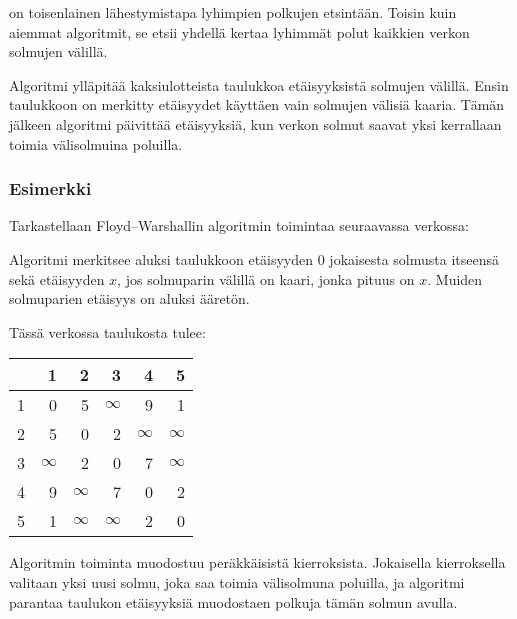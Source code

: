 
on toisenlainen lähestymistapa
lyhimpien polkujen etsintään.
Toisin kuin aiemmat algoritmit,
se  etsii yhdellä kertaa lyhimmät polut kaikkien
verkon solmujen välillä.


Algoritmi ylläpitää kaksiulotteista
taulukkoa etäisyyksistä solmujen
välillä.
Ensin taulukkoon on merkitty
etäisyydet käyttäen vain solmujen
välisiä kaaria.
Tämän jälkeen algoritmi
päivittää etäisyyksiä,
kun verkon solmut saavat yksi kerrallaan
toimia välisolmuina poluilla.

\subsubsection{Esimerkki}

Tarkastellaan Floyd–Warshallin
algoritmin toimintaa seuraavassa verkossa:

\begin{center}
\end{center}

Algoritmi merkitsee aluksi taulukkoon
etäisyyden 0 jokaisesta solmusta itseensä
sekä etäisyyden $x$, jos solmuparin välillä
on kaari, jonka pituus on $x$.
Muiden solmuparien etäisyys on aluksi ääretön.

Tässä verkossa taulukosta tulee:
\begin{center}
\begin{tabular}{r|rrrrr}
 & 1 & 2 & 3 & 4 & 5 \\
\hline
1 & 0 & 5 & $\infty$ & 9 & 1 \\
2 & 5 & 0 & 2 & $\infty$ & $\infty$ \\
3 & $\infty$ & 2 & 0 & 7 & $\infty$ \\
4 & 9 & $\infty$ & 7 & 0 & 2 \\
5 & 1 & $\infty$ & $\infty$ & 2 & 0 \\
\end{tabular}
\end{center}
\vspace{10pt}
Algoritmin toiminta muodostuu peräkkäisistä kierroksista.
Jokaisella kierroksella valitaan yksi uusi solmu,
joka saa toimia välisolmuna poluilla,
ja algoritmi parantaa taulukon
etäisyyksiä muodostaen polkuja tämän solmun avulla.

